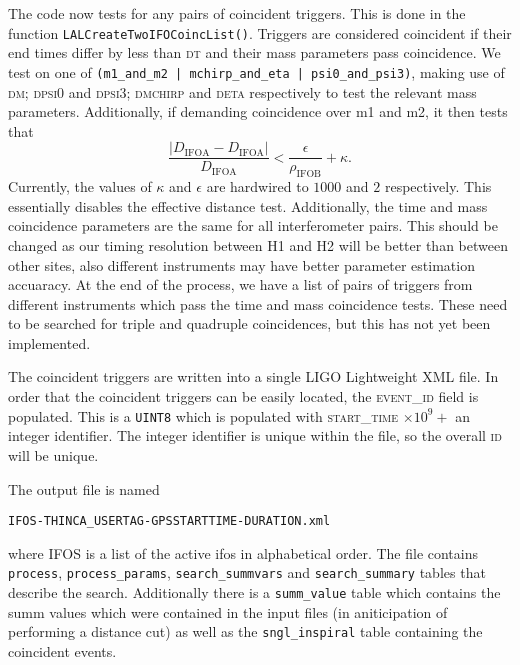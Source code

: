 \begin{entry}
The code now tests for any pairs of coincident triggers.  This is done in the
function \texttt{LALCreateTwoIFOCoincList()}.  Triggers are considered
coincident if their end times differ by less than \textsc{dt} and their mass
parameters pass coincidence.  We test on one of \texttt{(m1\_and\_m2 |
mchirp\_and\_eta | psi0\_and\_psi3)}, making use of \textsc{dm};
\textsc{dpsi0} and \textsc{dpsi3}; \textsc{dmchirp} and \textsc{deta}
respectively to test the relevant mass parameters.  Additionally, if demanding
coincidence over m1 and m2, it then tests that 
%
\begin{equation} \frac{\left|D_\mathrm{IFOA} -
  D_\mathrm{IFOA}\right|}{D_\mathrm{IFOA}} <
  \frac{\epsilon}{\rho_\mathrm{IFOB}} + \kappa.  \end{equation}
% 
Currently, the values of $\kappa$ and $\epsilon$ are hardwired to $1000$ and
$2$ respectively.  This essentially disables the effective distance test.
Additionally, the time and mass coincidence parameters are the same for all
interferometer pairs.  This should be changed as our timing resolution between
H1 and H2 will be better than between other sites, also different instruments
may have better parameter estimation accuaracy.  At the end of the process, we
have a list of pairs of triggers from different instruments which pass the
time and mass coincidence tests.  These need to be searched for triple and
quadruple coincidences, but this has not yet been implemented.

The coincident triggers are written into a single LIGO Lightweight XML file.
In order that the coincident triggers can be easily located, the
\textsc{event\_id} field is populated.  This is a \texttt{UINT8} which is
populated with \textsc{start\_time} $\times 10^{9} +$ an integer identifier.
The integer identifier is unique within the file, so the overall \textsc{id}
will be unique.  

The output file is named
\begin{center}
\texttt{IFOS-THINCA\_USERTAG-GPSSTARTTIME-DURATION.xml}\\
\end{center}
where \textsc{IFOS} is a list of the active ifos in alphabetical order.  The
file contains \texttt{process}, \texttt{process\_params},
\texttt{search\_summvars} and \texttt{search\_summary} tables that describe
the search.  Additionally there is a \texttt{summ\_value} table which contains
the summ values which were contained in the input files (in aniticipation of
performing a distance cut) as well as the \texttt{sngl\_inspiral} table
containing the coincident events.


\end{entry}

